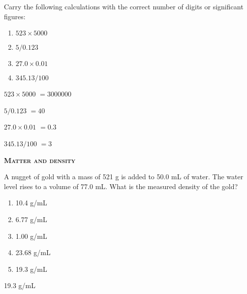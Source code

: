\documentclass[main.tex]{subfiles}
\begin{document}
\begin{multicols*}{2}
\begin{question}[ID=\the\value{numA}]
Carry the following calculations with the correct number of digits or significant figures:
  \begin{multicols}{2} \noindent
  \begin{enumerate} [topsep=0pt, partopsep=1pt, label=(\alph*), leftmargin=1cm]
   \item $523\times5000$	\iffalse $3000000$ \fi
  \item $5/0.123$	\iffalse $40$ \fi
  \item $27.0\times 0.01$	\iffalse $0.3$ \fi
    \item $ 345.13/ 100$	\iffalse $=3$ \fi
  \end{enumerate}\end{multicols}
\end{question}
\begin{solution}
\begin{inparaenum}[(a)]
   \item $523\times5000$	  $=3000000$  
  \item $5/0.123$	  $=40$  
  \item $27.0\times 0.01$	  $=0.3$  
      \item $ 345.13/ 100$	  $=3$ 
  \end{inparaenum}
\hspace{0.1cm}\end{solution}%










{\raggedright\textsc{\textbf{Matter and density }}\par}


\begin{question}[ID=\the\value{numA}]
A nugget of gold with a mass of 521 g is added to 50.0 mL of water.  The water level rises to a volume of 77.0 mL.  What is the measured density of the gold?   
\begin{multicols}{2}
  \noindent
  \begin{enumerate} [topsep=0pt, partopsep=1pt, label=(\alph*), leftmargin=1cm]
\item 10.4 g/mL
\item 6.77 g/mL
\item 1.00 g/mL
\item 23.68 g/mL
\item 19.3 g/mL
\end{enumerate}
\end{multicols}    
\end{question}
\begin{solution}
19.3 g/mL
\hspace{0.1cm}\end{solution}%



\end{multicols*}
\end{document}
